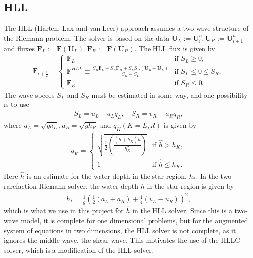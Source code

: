 \subsection*{HLL}
The HLL (Harten, Lax and van Leer) approach assumes a two-wave structure of the Riemann problem.
The solver is based on the data $\mathbf{U}_L := \mathbf{U}_i^n, \mathbf{U}_R := \mathbf{U}_{i+1}^n$ and fluxes $\mathbf{F}_L := \mathbf{F}(\mathbf{U}_L), \mathbf{F}_R := \mathbf{F}(\mathbf{U}_R)$.
The HLL flux is given by
\begin{align}\label{eq:HLL_flux}
    \mathbf{F}_{i + \frac{1}{2}} = \begin{cases}
        \mathbf{F}_L & \text{if } S_L \geq 0, \\
        \mathbf{F}^{HLL} \equiv \frac{S_R \mathbf{F}_L - S_L \mathbf{F}_R + S_L S_R (\mathbf{U}_R - \mathbf{U}_L)}{S_R - S_L} & \text{if } S_L \leq 0 \leq S_R, \\
        \mathbf{F}_R & \text{if } S_R \leq 0.
    \end{cases}
\end{align}
The wave speeds $S_L$ and $S_R$ must be estimated in some way, and one possibility is to use 
\begin{align*}
    S_L = u_L - a_L q_L, \quad S_R = u_R + a_R q_R,
\end{align*}
where $a_L = \sqrt{g h_L}, a_R = \sqrt{g h_R}$ and  $q_K (K=L, R)$ is given by 
\begin{align*}
    q_K = 
    \begin{cases}
        \sqrt{\frac{1}{2}\left( \frac{(\hat{h} + h_K) \hat{h}}{h_K^2} \right) } & \text{if } \hat{h} > h_K, \\
        1 & \text{if } \hat{h} \leq h_K.
    \end{cases}
\end{align*}
Here $\hat{h}$ is an estimate for the water depth in the star region, $h_*$.
In the two-rarefaction Riemann solver, the water depth $h$ in the star region is given by
\begin{align}\label{eq:two_rarefaction_hstar}
    h_* = \frac{1}{g} {\left( \frac{1}{2} (a_L + a_R) + \frac{1}{4} (u_L - u_R)  \right)}^2,
\end{align}
which is what we use in this project for $\hat{h}$ in the HLL solver.
Since this is a two-wave model, it is complete for one dimensional problems, but for the augmented system of equations in two dimensions, the HLL solver is not complete, as it ignores the middle wave, the shear wave.
This motivates the use of the HLLC solver, which is a modification of the HLL solver.


